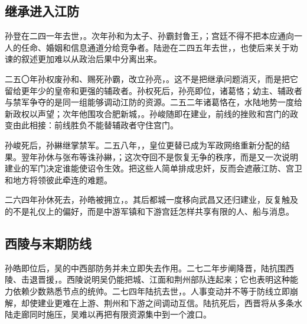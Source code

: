 \subsection{继承进入江防}

孙登在二四一年去世，。次年孙和为太子、孙霸封鲁王，；宫廷不得不把本应通向一人的任命、婚姻和信息通道分给竞争者。陆逊在二四五年去世，，也使后来关于劝谏的叙述更加难以从政治后果中分离出来。

二五〇年孙权废孙和、赐死孙霸，改立孙亮，。这不是把继承问题消灭，而是把它留给更年少的皇帝和更强的辅政者。孙权死后，孙亮即位，诸葛恪；幼主、辅政者与禁军争夺的是同一组能够调动江防的资源。二五二年诸葛恪在，水陆地势一度给新政权以声望；次年他围攻合肥新城，。孙峻随即在建业，前线的挫败和宫门的政变由此相接：前线胜负不能替辅政者守住宫门。

孙峻死后，孙綝继掌禁军。二五八年，，皇位更替已成为军政网络重新分配的结果。翌年孙休与张布等诛孙綝，；这次夺回不是恢复无争的秩序，而是又一次说明建业的军门决定谁能使诏令生效。把这些人简单排成忠奸，反而会遮蔽江防、宫卫和地方将领彼此牵连的难题。

二六四年孙休死去，孙皓被拥立，。其后都城一度移向武昌又还归建业，反复触及的不是礼仪上的偏好，而是中游军镇和下游宫廷怎样共享有限的人、船与消息。

\subsection{西陵与末期防线}

孙皓即位后，吴的中西部防务并未立即失去作用。二七二年步阐降晋，陆抗围西陵、击退晋援，。西陵说明吴仍能把城、江面和荆州部队连起来；它也表明这种能力依赖少数熟悉节点的统帅。二七四年陆抗去世，。人事变动并不等于防线立即崩解，却使建业更难在上游、荆州和下游之间调动互信。陆抗死后，西晋将从多条水陆走廊同时施压，吴难以再把有限资源集中到一个渡口。

